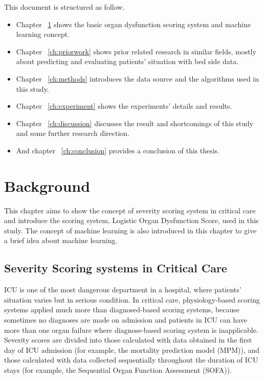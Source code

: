 \documentclass[12pt,a4paper,english
]{tunithesis}
\begin{document}
This document is structured as follow. 
\begin{itemize}
\item Chapter ~\ref{ch:background} shows the basic organ dysfunction scoring system and machine learning concept. 
\item Chapter ~\ref{ch:priorwork} shows prior related research in similar fields, mostly about predicting and evaluating patients' situation with bed side data. 
\item Chapter ~\ref{ch:methods} introduces the data source and the algorithms used in this study. 
\item Chapter ~\ref{ch:experiment} shows the experiments' details and results. 
\item Chapter ~\ref{ch:discussion} discusses the result and shortcomings of this study and some further research direction. 
\item And chapter ~\ref{ch:conclusion} provides a conclusion of this thesis.
\end{itemize}


\chapter{Background}
\label{ch:background}
This chapter aims to show the concept of severity scoring system in critical care and introduce the scoring system, Logistic Organ Dysfunction Score, used in this study. The concept of machine learning is also introduced in this chapter to give a brief idea about machine learning.

\section{Severity Scoring systems in Critical Care}
ICU is one of the most dangerous department in a hospital, where patients' situation varies but in serious condition. In critical care, physiology-based scoring systems applied much more than diagnosed-based scoring systems, because sometimes no diagnoses are made on admission and patients in ICU can have more than one organ failure where diagnose-based scoring system is inapplicable. \parencite{Bouch2008} Severity scores are divided into those calculated with data obtained in the first day of ICU admission (for example, the mortality prediction model (MPM)), and those calculated with data collected sequentially throughout the duration of ICU stays (for example, the Sequential Organ Function Assessment (SOFA)). 
\end{document}

